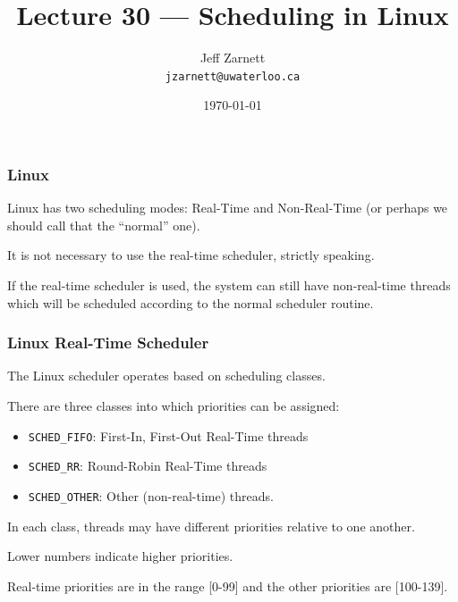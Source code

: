 

\title{Lecture 30 --- Scheduling in Linux }

\author{Jeff Zarnett \\ \small \texttt{jzarnett@uwaterloo.ca}}
\date{\today}




\begin{frame}
  \titlepage

 \end{frame}
 
 
\begin{frame}
\frametitle{Linux}

Linux has two scheduling modes: Real-Time and Non-Real-Time (or perhaps we should call that the ``normal'' one). 

It is not necessary to use the real-time scheduler, strictly speaking. 

If the real-time scheduler is used, the system can still have non-real-time threads which will be scheduled according to the normal scheduler routine.

\end{frame}

\begin{frame}
\frametitle{Linux Real-Time Scheduler}

The Linux scheduler operates based on \alert{scheduling classes}.

There are three classes into which priorities can be assigned:

\begin{itemize}
	\item \texttt{SCHED\_FIFO}: First-In, First-Out Real-Time threads
	\item \texttt{SCHED\_RR}: Round-Robin Real-Time threads
	\item \texttt{SCHED\_OTHER}: Other (non-real-time) threads.
\end{itemize}


In each class, threads may have different priorities relative to one another. 

Lower numbers indicate higher priorities. 

Real-time priorities are in the range [0-99] and the other priorities are [100-139].

\end{frame}

